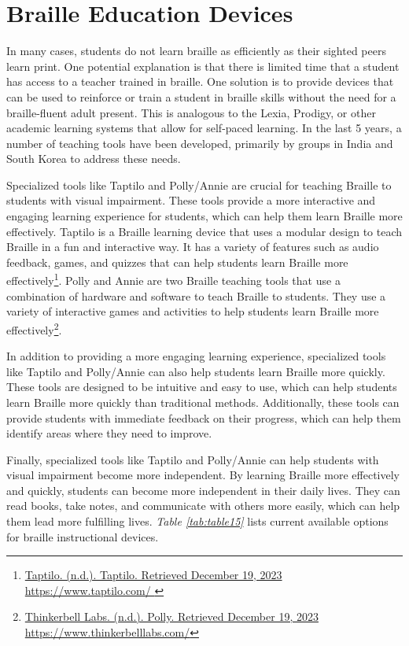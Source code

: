 \pagebreak
\hypertarget{learning-tools}{}\section{Braille Education Devices}\label{learning-tools}
In many cases, students do not learn braille as efficiently as their sighted peers learn print. One potential explanation is that there is limited time that a student has access to a teacher trained in braille. One solution is to provide devices that can be used to reinforce or train a student in braille skills without the need for a braille-fluent adult present. This is analogous to the Lexia, Prodigy, or other academic learning systems that allow for self-paced learning. In the last 5 years, a number of teaching tools have been developed, primarily by groups in India and South Korea to address these needs.

Specialized tools like Taptilo and Polly/Annie are crucial for teaching Braille to students with visual impairment. These tools provide a more interactive and engaging learning experience for students, which can help them learn Braille more effectively. Taptilo is a Braille learning device that uses a modular design to teach Braille in a fun and interactive way. It has a variety of features such as audio feedback, games, and quizzes that can help students learn Braille more effectively\footnote{\raggedright \href{https://www.taptilo.com/ }{Taptilo. (n.d.). Taptilo. Retrieved December 19, 2023} \href{https://www.taptilo.com/ }{https://www.taptilo.com/ }}. Polly and Annie are two Braille teaching tools that use a combination of hardware and software to teach Braille to students. They use a variety of interactive games and activities to help students learn Braille more effectively\footnote{\raggedright \href{https://www.thinkerbelllabs.com/}{Thinkerbell Labs. (n.d.). Polly. Retrieved December 19, 2023} \href{https://www.thinkerbelllabs.com/}{https://www.thinkerbelllabs.com/}}.

In addition to providing a more engaging learning experience, specialized tools like Taptilo and Polly/Annie can also help students learn Braille more quickly. These tools are designed to be intuitive and easy to use, which can help students learn Braille more quickly than traditional methods. Additionally, these tools can provide students with immediate feedback on their progress, which can help them identify areas where they need to improve.

Finally, specialized tools like Taptilo and Polly/Annie can help students with visual impairment become more independent. By learning Braille more effectively and quickly, students can become more independent in their daily lives. They can read books, take notes, and communicate with others more easily, which can help them lead more fulfilling lives.
\textit{Table \ref{tab:table15}} lists current available options for braille instructional devices.

